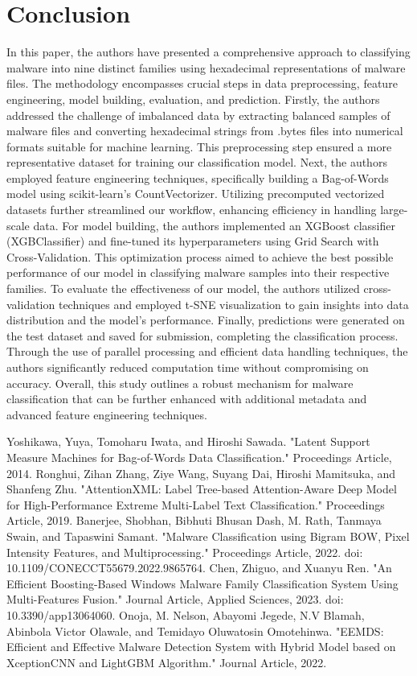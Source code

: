 \documentclass[conference]{IEEEtran}
\begin{document}
\section{Conclusion}
In this paper, the authors have presented a comprehensive approach to classifying malware into nine distinct families using hexadecimal representations of malware files. The methodology encompasses crucial steps in data preprocessing, feature engineering, model building, evaluation, and prediction. Firstly, the authors addressed the challenge of imbalanced data by extracting balanced samples of malware files and converting hexadecimal strings from .bytes files into numerical formats suitable for machine learning. This preprocessing step ensured a more representative dataset for training our classification model. 
Next, the authors employed feature engineering techniques, specifically building a Bag-of-Words model using scikit-learn's CountVectorizer. Utilizing precomputed vectorized datasets further streamlined our workflow, enhancing efficiency in handling large-scale data. For model building, the authors implemented an XGBoost classifier (XGBClassifier) and fine-tuned its hyperparameters using Grid Search with Cross-Validation. This optimization process aimed to achieve the best possible performance of our model in classifying malware samples into their respective families.
To evaluate the effectiveness of our model, the authors utilized cross-validation techniques and employed t-SNE visualization to gain insights into data distribution and the model's performance. Finally, predictions were generated on the test dataset and saved for submission, completing the classification process. Through the use of parallel processing and efficient data handling techniques, the authors significantly reduced computation time without compromising on accuracy. Overall, this study outlines a robust mechanism for malware classification that can be further enhanced with additional metadata and advanced feature engineering techniques. 


\begin{thebibliography}{00}
 Yoshikawa, Yuya, Tomoharu Iwata, and Hiroshi Sawada. "Latent Support Measure Machines for Bag-of-Words Data Classification." Proceedings Article, 2014.
 Ronghui, Zihan Zhang, Ziye Wang, Suyang Dai, Hiroshi Mamitsuka, and Shanfeng Zhu. "AttentionXML: Label Tree-based Attention-Aware Deep Model for High-Performance Extreme Multi-Label Text Classification." Proceedings Article, 2019.
 Banerjee, Shobhan, Bibhuti Bhusan Dash, M. Rath, Tanmaya Swain, and Tapaswini Samant. "Malware Classification using Bigram BOW, Pixel Intensity Features, and Multiprocessing." Proceedings Article, 2022. doi: 10.1109/CONECCT55679.2022.9865764.
 Chen, Zhiguo, and Xuanyu Ren. "An Efficient Boosting-Based Windows Malware Family Classification System Using Multi-Features Fusion." Journal Article, Applied Sciences, 2023. doi: 10.3390/app13064060.
 Onoja, M. Nelson, Abayomi Jegede, N.V Blamah, Abinbola Victor Olawale, and Temidayo Oluwatosin Omotehinwa. "EEMDS: Efficient and Effective Malware Detection System with Hybrid Model based on XceptionCNN and LightGBM Algorithm." Journal Article, 2022.
\end{thebibliography}
\end{document}
